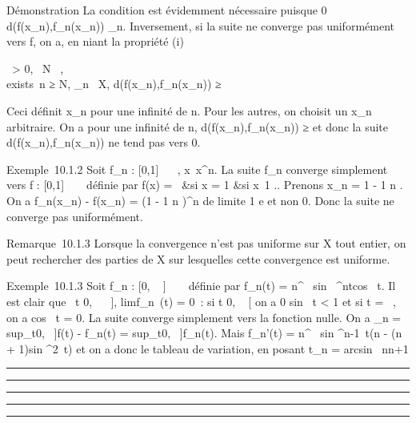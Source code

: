 \documentclass[]{article}
\begin{document}
Démonstration La condition est évidemment nécessaire puisque 0 \leq
d(f(x_n),f_n(x_n)) \leq \mu_n.
Inversement, si la suite ne converge pas uniformément vers f, on a, en
niant la propriété (i)

\exists~\epsilon \textgreater{} 0,
\forall~N \in {}~, \\exists~n ≥ N,
\existsx_n~ \in X,\quad
d(f(x_n),f_n(x_n)) ≥ \epsilon

Ceci définit x_n pour une infinité de n. Pour les autres, on
choisit un x_n arbitraire. On a pour une infinité de n,
d(f(x_n),f_n(x_n)) ≥ \epsilon et donc la suite
d(f(x_n),f_n(x_n)) ne tend pas vers 0.

Exemple~10.1.2 Soit f_n : {[}0,1{]} \rightarrow~ ~,
x\mapsto~x^n. La suite f_n
converge simplement vers f : {[}0,1{]} \rightarrow~ ~ définie par f(x) =
\left \ &si x
= 1 &si x\neq~1 
\right .. Prenons x_n = 1 - 1
\over n . On a f_n(x_n) -
f(x_n) = (1 - 1 \over n )^n de
limite  1 \over e et non 0. Donc la suite ne converge
pas uniformément.

Remarque~10.1.3 Lorsque la convergence n'est pas uniforme sur X tout
entier, on peut rechercher des parties de X sur lesquelles cette
convergence est uniforme.

Exemple~10.1.3 Soit f_n : {[}0, \pi~ {]}
\rightarrow~ ~ définie par f_n(t) =
n^\alpha~ sin~
^ntcos~ t. Il est clair que
\forall~t \in {[}0, \pi~~ {]},
limf_n~(t) = 0~: si t \in {[}0,
\pi~ {[} on a 0 \leq sin~ t
\textless{} 1 et si t = \pi~, on a cos~ t = 0.
La suite converge simplement vers la fonction nulle. On a \mu_n
= sup_t\in{[}0,\pi~ {]}f(t) - f_n(t)
= sup_t\in{[}0,\pi~ {]}f_n(t). Mais f_n'(t) =
n^\alpha~ sin ^n-1~t(n - (n +
1)sin ^2~t) et on a donc le tableau
de variation, en posant t_n = arcsin~
\sqrt n\over n+1

\begin{center}\rule{3in}{0.4pt}\end{center}

\begin{center}\rule{3in}{0.4pt}\end{center}

\begin{center}\rule{3in}{0.4pt}\end{center}

\begin{center}\rule{3in}{0.4pt}\end{center}

\begin{center}\rule{3in}{0.4pt}\end{center}
\end{document}
